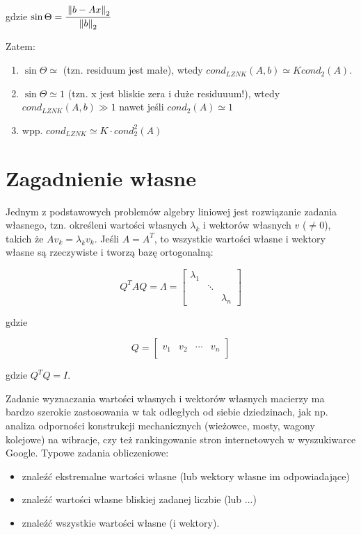 \documentclass[hidelinks,a4paper,fleqn]{article}
\newcommand{\norm}[1]{\left\lVert#1\right\rVert}
\begin{document}
gdzie $\sin{\Theta} = \cfrac{\norm{b - Ax}_2}{\norm{b}_2}$

Zatem:

\begin{enumerate}
	\item $\sin\Theta \simeq$ (tzn. residuum jest małe), wtedy $cond_{LZNK}(A, b) \simeq K cond_2(A)$.
	      	
	\item $\sin\Theta \simeq 1$ (tzn. x jest bliskie zera i duże residuuum!), wtedy $cond_{LZNK}(A, b)\gg 1$ nawet jeśli $cond_2(A) \simeq 1$
	      	
	\item wpp. $cond_{LZNK} \simeq K \cdot cond_2^2(A)$
\end{enumerate}

\section{Zagadnienie własne}
Jednym z podstawowych problemów algebry liniowej jest rozwiązanie zadania własnego, tzn. określeni wartości własnych $\lambda_k$ i wektorów własnych $v$ ($\neq 0$), takich że $Av_k = \lambda_k v_k$. Jeśli $A = A^T$, to wszystkie wartości własne i wektory własne są rzeczywiste i tworzą bazę ortogonalną:

\[
	Q^TAQ = \Lambda = \left[\begin{array}{ccc}
	\lambda_1 &  & \\ 
	&  \ddots & \\ 
	&  & \lambda_n
	\end{array}\right]
\]

gdzie

\[
	Q = \left[ \begin{array}{c|c|c|c} & & & \\ v_1 & v_2 & \cdots & v_n \\ & & & \end{array} \right]
\]

gdzie $Q^TQ = I$.

Zadanie wyznaczania wartości własnych i wektorów własnych macierzy ma bardzo szerokie zastosowania w tak odległych od siebie dziedzinach, jak np. analiza odporności konstrukcji mechanicznych (wieżowce, mosty, wagony kolejowe) na wibracje, czy też rankingowanie stron internetowych w wyszukiwarce Google. Typowe zadania obliczeniowe:

\begin{itemize}
	\item znaleźć ekstremalne wartości własne (lub wektory własne im odpowiadające)
	\item znaleźć wartości własne bliskiej zadanej liczbie (lub ...)
	\item znaleźć wszystkie wartości własne (i wektory).
\end{itemize}
\end{document}
